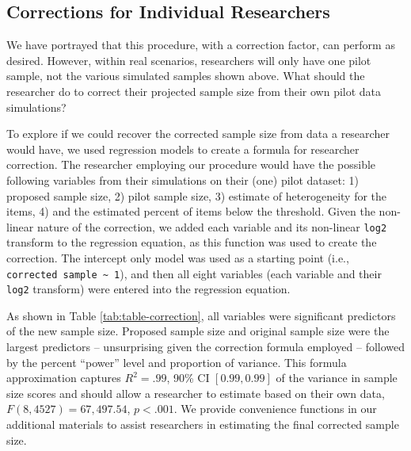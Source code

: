 \documentclass[
  man]{apa7}
\begin{document}
\subsection{Corrections for Individual Researchers}\label{corrections-for-individual-researchers}

We have portrayed that this procedure, with a correction factor, can perform as desired. However, within real scenarios, researchers will only have one pilot sample, not the various simulated samples shown above. What should the researcher do to correct their projected sample size from their own pilot data simulations?

To explore if we could recover the corrected sample size from data a researcher would have, we used regression models to create a formula for researcher correction. The researcher employing our procedure would have the possible following variables from their simulations on their (one) pilot dataset: 1) proposed sample size, 2) pilot sample size, 3) estimate of heterogeneity for the items, 4) and the estimated percent of items below the threshold. Given the non-linear nature of the correction, we added each variable and its non-linear \texttt{log2} transform to the regression equation, as this function was used to create the correction. The intercept only model was used as a starting point (i.e., \texttt{corrected\ sample\ \textasciitilde{}\ 1}), and then all eight variables (each variable and their \texttt{log2} transform) were entered into the regression equation.

As shown in Table \ref{tab:table-correction}, all variables were significant predictors of the new sample size. Proposed sample size and original sample size were the largest predictors -- unsurprising given the correction formula employed -- followed by the percent ``power'' level and proportion of variance. This formula approximation captures \(R^2 = .99\), 90\% CI \([0.99, 0.99]\) of the variance in sample size scores and should allow a researcher to estimate based on their own data, \(F(8, 4527) = 67,497.54\), \(p < .001\). We provide convenience functions in our additional materials to assist researchers in estimating the final corrected sample size.
\end{document}
